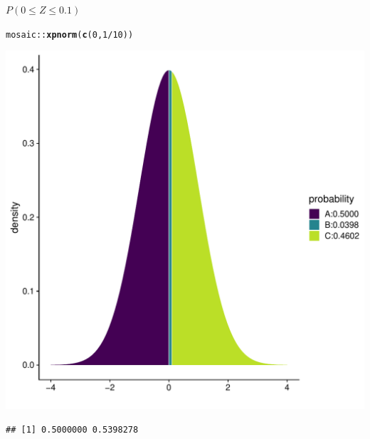 \documentclass[10pt]{beamer}\usepackage[]{graphicx}\usepackage[]{color}
\makeatletter
\newcommand{\hlnum}[1]{\textcolor[rgb]{0.686,0.059,0.569}{#1}}%
\newcommand{\hlopt}[1]{\textcolor[rgb]{0,0,0}{#1}}%
\newcommand{\hlstd}[1]{\textcolor[rgb]{0.345,0.345,0.345}{#1}}%
\newcommand{\hlkwd}[1]{\textcolor[rgb]{0.737,0.353,0.396}{\textbf{#1}}}%
\newenvironment{kframe}{%
 \def\at@end@of@kframe{}%
 \ifinner\ifhmode%
  \def\at@end@of@kframe{\end{minipage}}%
  \begin{minipage}{\columnwidth}%
 \fi\fi%
 \def\FrameCommand##1{\hskip\@totalleftmargin \hskip-\fboxsep
 \colorbox{shadecolor}{##1}\hskip-\fboxsep
     \hskip-\linewidth \hskip-\@totalleftmargin \hskip\columnwidth}%
 \MakeFramed {\advance\hsize-\width
   \@totalleftmargin\z@ \linewidth\hsize
   \@setminipage}}%
 {\par\unskip\endMakeFramed%
 \at@end@of@kframe}
\newenvironment{knitrout}{}{} %
\makeatother
\begin{document}
\begin{frame}[fragile]{$P(0 \leq Z \leq 0.1)$}

	
\begin{knitrout}\tiny
{}\color{fgcolor}\begin{kframe}
\begin{alltt}
\hlstd{mosaic}\hlopt{::}\hlkwd{xpnorm}\hlstd{(}\hlkwd{c}\hlstd{(}\hlnum{0}\hlstd{,}\hlnum{1}\hlopt{/}\hlnum{10}\hlstd{))}
\end{alltt}
\end{kframe}

{\centering \includegraphics[width=0.60\linewidth]{figure/unnamed-chunk-2-1} 

}


\begin{kframe}\begin{verbatim}
## [1] 0.5000000 0.5398278
\end{verbatim}
\end{kframe}
\end{knitrout}
\end{frame}
\end{document}

